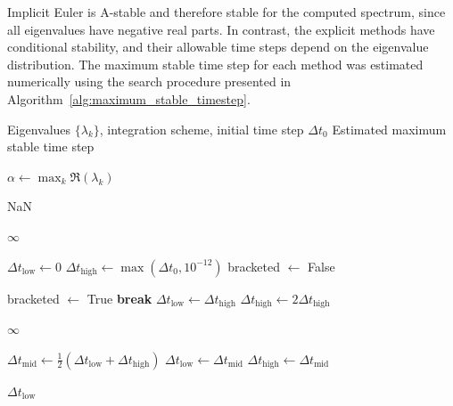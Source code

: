 Implicit Euler is A-stable and therefore stable for the
computed spectrum, since all eigenvalues have negative
real parts. In contrast, the explicit methods have
conditional stability, and their allowable time steps
depend on the eigenvalue distribution. The maximum stable
time step for each method was estimated numerically using
the search procedure presented in
Algorithm~\ref{alg:maximum_stable_timestep}.

\begin{algorithm}[htbp]
    \caption{Numerical estimation of the maximum stable time step}
    \label{alg:maximum_stable_timestep}
    \small
    \begin{algorithmic}[1]
        \Require Eigenvalues $\{\lambda_k\}$, integration scheme,
                 initial time step $\Delta t_0$
        \Ensure Estimated maximum stable time step

        \State $\alpha \gets \max_k \Re(\lambda_k)$

            \State \Return NaN
        \EndIf

            \State \Return $\infty$
        \EndIf

        \State $\Delta t_{\mathrm{low}} \gets 0$
        \State $\Delta t_{\mathrm{high}} \gets
               \max(\Delta t_0,10^{-12})$
        \State bracketed $\gets$ False

                \State bracketed $\gets$ True
                \State \textbf{break}
            \EndIf
            \State $\Delta t_{\mathrm{low}}
                   \gets \Delta t_{\mathrm{high}}$
            \State $\Delta t_{\mathrm{high}}
                   \gets 2\Delta t_{\mathrm{high}}$
        \EndFor

            \State \Return $\infty$
        \EndIf

            \State $\Delta t_{\mathrm{mid}}
                   \gets \frac{1}{2}
                   (\Delta t_{\mathrm{low}}+
                   \Delta t_{\mathrm{high}})$
                \State $\Delta t_{\mathrm{low}}
                       \gets \Delta t_{\mathrm{mid}}$
            \Else
                \State $\Delta t_{\mathrm{high}}
                       \gets \Delta t_{\mathrm{mid}}$
            \EndIf
        \EndFor

        \State \Return $\Delta t_{\mathrm{low}}$
    \end{algorithmic}
\end{algorithm}

